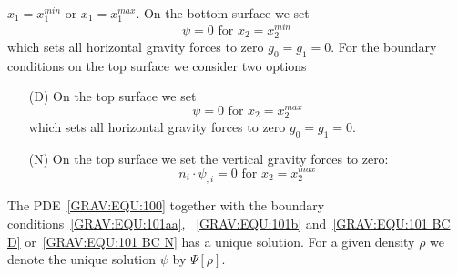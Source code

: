 $x_1=x^{min}_1$ or 
$x_1=x^{max}_1$. On the bottom surface we set 
\begin{equation}\label{GRAV:EQU:101b}
\psi = 0 \mbox{ for } x_2=x^{min}_2
\end{equation} 
which sets all horizontal gravity forces to zero $g_0=g_1=0$. 
For the boundary conditions on the top surface we consider two options
\begin{itemize}
 \item[(D)] 
On the top surface we set 
\begin{equation}\label{GRAV:EQU:101 BC D}
\psi = 0 \mbox{ for } x_2=x^{max}_2
\end{equation} 
which sets all horizontal gravity forces to zero $g_0=g_1=0$.
 \item[(N)] 
On the top surface we set the vertical gravity forces to zero:
\begin{equation}\label{GRAV:EQU:101 BC N}
n_i \cdot  \psi_{,i} = 0 \mbox{ for } x_2=x^{max}_2
\end{equation} 
\end{itemize}
The PDE~\ref{GRAV:EQU:100} together with the boundary conditions~\ref{GRAV:EQU:101aa}, ~\ref{GRAV:EQU:101b}
and~\ref{GRAV:EQU:101 BC D} or~\ref{GRAV:EQU:101 BC N}
has a unique solution. For a given density $\rho$ we denote the unique solution $\psi$ by $\Psi[\rho]$.


